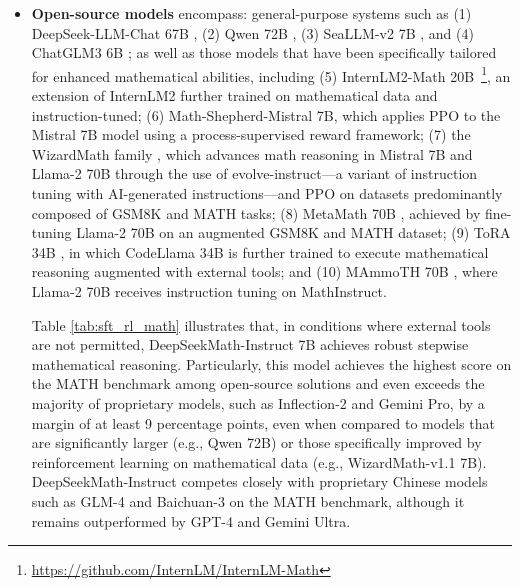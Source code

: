 \begin{itemize}[topsep=0pt]
\begin{itemize}[topsep=0pt]
    \item \textbf{Closed-source models} include: (1) various members of the GPT family, notably GPT-4 \citep{gpt4} and GPT-4 Code Interpreter~\footnote{\url{https://openai.com/blog/chatgpt-plugins\#\#code-interpreter}}, (2) Gemini Ultra and Pro \citep{gemini}, (3) Inflection-2 \citep{inflection-2}, (4) Grok-1~\footnote{\url{https://x.ai/model-card}}, and additional recent entrants from Chinese organizations such as (5) Baichuan-3~\footnote{\url{https://www.baichuan-ai.com}}, (6) the latest GLM-4~\footnote{\url{https://open.bigmodel.cn/dev/api\#glm-4}}

    from the GLM family \citep{glm}.
\end{itemize}

These models are designed for a wide range of applications and have generally been subjected to various alignment processes. 
\item \textbf{Open-source models} encompass: general-purpose systems such as (1) DeepSeek-LLM-Chat 67B \citep{deepseek-llm}, (2) Qwen 72B \citep{qwen}, (3) SeaLLM-v2 7B \citep{seallm}, and (4) ChatGLM3 6B \citep{chatglm3}; as well as those models that have been specifically tailored for enhanced mathematical abilities, including (5) InternLM2-Math 20B~\footnote{\url{https://github.com/InternLM/InternLM-Math}}, an extension of InternLM2 further trained on mathematical data and instruction-tuned; (6) Math-Shepherd-Mistral 7B, which applies PPO \citep{schulman2017proximal} to the Mistral 7B \citep{mistral} model using a process-supervised reward framework; (7) the WizardMath family \citep{wizardmath}, which advances math reasoning in Mistral 7B and Llama-2 70B \citep{llama2} through the use of evolve-instruct—a variant of instruction tuning with AI-generated instructions—and PPO on datasets predominantly composed of GSM8K and MATH tasks; (8) MetaMath 70B \citep{metamath}, achieved by fine-tuning Llama-2 70B on an augmented GSM8K and MATH dataset; (9) ToRA 34B \cite{tora}, in which CodeLlama 34B is further trained to execute mathematical reasoning augmented with external tools; and (10) MAmmoTH 70B \citep{MathInstruct}, where Llama-2 70B receives instruction tuning on MathInstruct.

Table \ref{tab:sft_rl_math} illustrates that, in conditions where external tools are not permitted, DeepSeekMath-Instruct 7B achieves robust stepwise mathematical reasoning. Particularly, this model achieves the highest score on the MATH benchmark among open-source solutions and even exceeds the majority of proprietary models, such as Inflection-2 and Gemini Pro, by a margin of at least 9 percentage points, even when compared to models that are significantly larger (e.g., Qwen 72B) or those specifically improved by reinforcement learning on mathematical data (e.g., WizardMath-v1.1 7B). DeepSeekMath-Instruct competes closely with proprietary Chinese models such as GLM-4 and Baichuan-3 on the MATH benchmark, although it remains outperformed by GPT-4 and Gemini Ultra.


\end{itemize}
